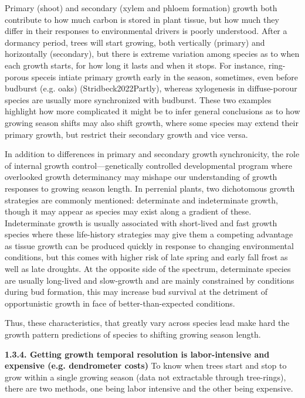 \documentclass{article}
\begin{document}
Primary (shoot) and secondary (xylem and phloem formation) growth both contribute to how much carbon is stored in plant tissue, but how much they differ in their responses to environmental drivers is poorly understood. After a dormancy period, trees will start growing, both vertically (primary) and horizontally (secondary), but there is extreme variation among species as to when each growth starts, for how long it lasts and when it stops. For instance, ring-porous speceis intiate primary growth early in the season, sometimes, even before budburst (e.g. oaks) (Stridbeck2022Partly), whereas xylogenesis in diffuse-porour species are usually more synchronized with budburst. These two examples highlight how more complicated it might be to infer general conclusions as to how growing season shifts may also shift growth, where some species may extend their primary growth, but restrict their secondary growth and vice versa.

In addition to differences in primary and secondary growth synchronicity, the role of internal growth control---genetically controlled developmental program where overlooked growth determinancy may mishape our understanding of growth responses to growing season length. In perrenial plants, two dichotomous growth strategies are commonly mentioned: determinate and indeterminate growth, though it may appear as species may exist along a gradient of these. Indeterminate growth is usually associated with short-lived and fast growth species where these life-history strategies may give them a competing advantage as tissue growth can be produced quickly in response to changing environmental conditions, but this comes with higher risk of late spring and early fall frost as well as late droughts. At the opposite side of the spectrum, determinate species are usually long-lived and slow-growth and are mainly constrained by conditions during bud formation, this may increase bud survival at the detriment of opportunistic growth in face of better-than-expected conditions. 

Thus, these characteristics, that greatly vary across species lead make hard the growth pattern predictions of species to shifting growing season length.%

\textbf{1.3.4. Getting growth temporal resolution is labor-intensive and expensive (e.g. dendrometer costs)}
To know when trees start and stop to grow within a single growing season (data not extractable through tree-rings), there are two methods, one being labor intensive and the other being expensive. 
\end{document}
